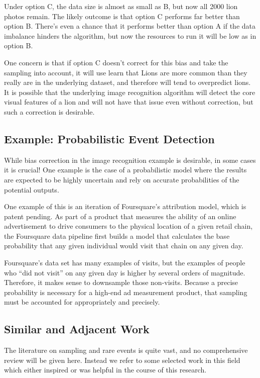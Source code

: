 \documentclass[twoside]{article}
\begin{document}
Under option C, the data size is almost as small as B, but now all 2000 lion photos remain. The likely outcome is that option C performs far better than option B. There's even a chance that it performs better than option A if the data imbalance hinders the algorithm, but now the resources to run it will be low as in option B.

One concern is that if option C doesn't correct for this bias and take the sampling into account, it will use learn that Lions are more common than they really are in the underlying dataset, and therefore will tend to overpredict lions. It is possible that the underlying image recognition algorithm will detect the core visual features of a lion and will not have that issue even without correction, but such a correction is desirable.

\subsection{Example: Probabilistic Event Detection}

While bias correction in the image recognition example is desirable, in some cases it is crucial! One example is the case of a probabilistic model where the results are expected to be highly uncertain and rely on accurate probabilities of the potential outputs.

One example of this is an iteration of Foursquare’s attribution model, which is patent pending\cite{visitprediction}. As part of a product that measures the ability of an online advertisement to drive consumers to the physical location of a given retail chain, the Foursquare data pipeline first builds a model that calculates the base probability that any given individual would visit that chain on any given day.

Foursquare's data set has many examples of visits, but the examples of people who “did not visit” on any given day is higher by several orders of magnitude. Therefore, it makes sense to downsample those non-visits. Because a precise probability is necessary for a high-end ad measurement product, that sampling must be accounted for appropriately and precisely.

\subsection{Similar and Adjacent Work}

The literature on sampling and rare events is quite vast, and no comprehensive review will be given here. Instead we refer to some selected work in this field which either inspired or was helpful in the course of this research.
\end{document}
